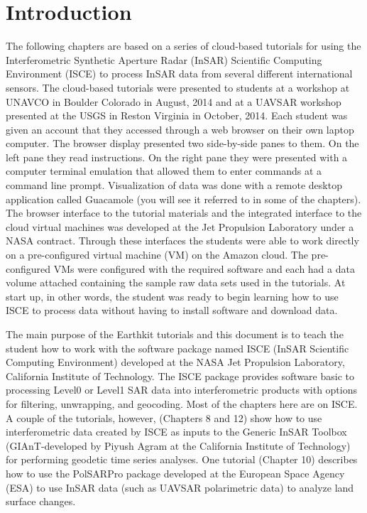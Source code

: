 \documentclass[11pt]{book}
\begin{document}
\chapter{Introduction}
The following chapters are based on a series of cloud-based tutorials for using
the Interferometric Synthetic Aperture Radar (InSAR) Scientific Computing Environment
(ISCE) to process InSAR data from several different international sensors.
The cloud-based tutorials were presented to
students at a workshop at UNAVCO in Boulder Colorado in August, 2014 and at a UAVSAR
workshop presented at the USGS in Reston Virginia in October, 2014.  Each student was
given an account that they accessed through a web browser on their own laptop computer.
The browser display presented two side-by-side panes to them.  On the left pane they
read instructions. On the right pane they were presented with a computer terminal
emulation that allowed them to enter commands at a command line prompt.  Visualization
of data was done with a remote desktop application called Guacamole (you will see it
referred to in some of the chapters). The browser interface to the tutorial materials
and the integrated interface to the cloud virtual machines was developed at the Jet
Propulsion Laboratory under a NASA contract. Through these interfaces the students were able
to work directly on a pre-configured virtual machine (VM) on the Amazon cloud.
The pre-configured VMs were configured with the required software and
each had a data volume attached containing the sample raw data sets used in the
tutorials.  At start up, in other words, the student was ready to begin learning how
to use ISCE to process data without having to install software and download data.

The main purpose of the Earthkit tutorials and this document is to teach the student how
to work with the software package named ISCE (InSAR Scientific Computing Environment)
developed at the NASA Jet Propulsion Laboratory, California Institute of Technology.
The ISCE package provides software basic to processing Level0 or Level1 SAR data into
interferometric products with options for filtering, unwrapping, and geocoding.  Most
of the chapters here are on ISCE.  A couple of the tutorials, however, (Chapters 8 and 12)
show how to use interferometric data created by ISCE as inputs to the Generic InSAR Toolbox
(GIAnT-developed by Piyush Agram at the California Institute of Technology)
for performing geodetic time series analyses.  One tutorial (Chapter 10) describes how
to use the PolSARPro package developed at the European Space Agency (ESA) to use InSAR data
(such as UAVSAR polarimetric data) to analyze land surface changes.
\end{document}
